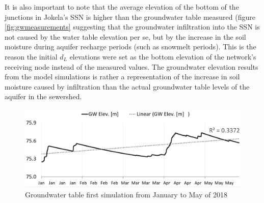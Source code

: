 It is also important to note that the average elevation of the bottom of the junctions in Jokela's \ac{SSN} is higher than the groundwater table measured (figure \ref{fig:gwmeasurements} suggesting that the groundwater infiltration into the \ac{SSN} is not caused by the water table elevation per se, but by the increase in the soil moisture during aquifer recharge periods (such as snowmelt periods). This is the reason the initial $d_L$ elevations were set as the bottom elevation of the network's receiving node instead of the measured values. The groundwater elevation results from the model simulations is rather a representation of the increase in soil moisture caused by infiltration than the actual groundwater table levels of the aquifer in the sewershed. 

\begin{figure}[h]
    \centering
	\includegraphics[scale=0.5]{figures/gw1stsimulation_gwlevel.png}
	\caption{Groundwater table first simulation from January to May of 2018}
	\label{fig:h1position}
\end{figure}









